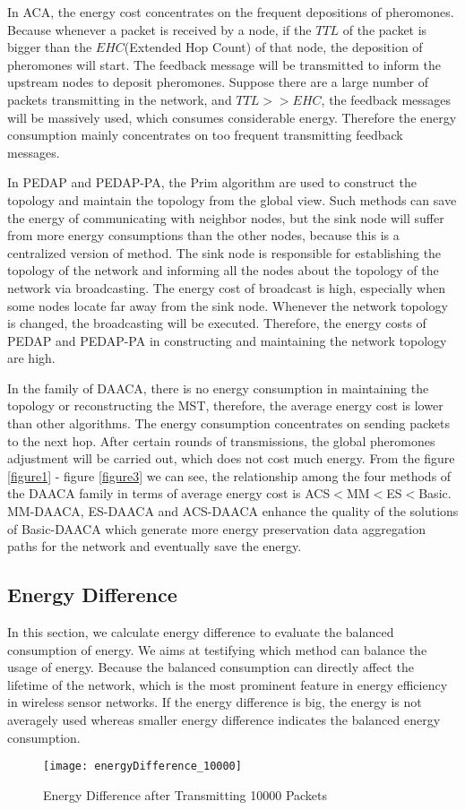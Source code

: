 \documentclass{elsarticle}
\begin{document}
In ACA, the energy cost concentrates on the frequent depositions of pheromones. Because whenever a packet is received by a node, if the $TTL$ of the packet is bigger than the $EHC$(Extended Hop Count)\cite{label-10} of that node, the deposition of pheromones will start. The feedback message will be transmitted to inform the upstream nodes to deposit pheromones. Suppose there are a large number of packets transmitting in the network, and $TTL>>EHC$, the feedback messages will be massively used, which consumes considerable energy. Therefore the energy consumption mainly concentrates on too frequent transmitting feedback messages.

In PEDAP and PEDAP-PA, the Prim algorithm are used to construct the topology and maintain the topology from the global view. Such methods can save the energy of communicating with neighbor nodes, but the sink node will suffer from more energy consumptions than the other nodes, because this is a centralized version of method. The sink node is responsible for establishing the topology of the network and informing all the nodes about the topology of the network via broadcasting. The energy cost of broadcast is high, especially when some nodes locate far away from the sink node. Whenever the network topology is changed, the broadcasting will be executed. Therefore, the energy costs of PEDAP and PEDAP-PA in constructing and maintaining the network topology are high.

In the family of DAACA, there is no energy consumption in maintaining the topology or reconstructing the MST, therefore, the average energy cost is lower than other algorithms. The energy consumption concentrates on sending packets to the next hop. After certain rounds of transmissions, the global pheromones adjustment will be carried out, which does not cost much energy. From the figure \ref{figure1} - figure \ref{figure3} we can see, the relationship among the four methods of the DAACA family in terms of average energy cost is ACS$ < $MM$ < $ES$ < $Basic. MM-DAACA, ES-DAACA and ACS-DAACA enhance the quality of the solutions of Basic-DAACA which generate more energy preservation data aggregation paths for the network and eventually save the energy.

\subsection{Energy Difference} \label{EnergyDifference}
In this section, we calculate energy difference to evaluate the balanced consumption of energy. We aims at testifying which method can balance the usage of energy. Because the balanced consumption can directly affect the lifetime of the network, which is the most prominent feature in energy efficiency in wireless sensor networks. If the energy difference is big, the energy is not averagely used whereas smaller energy difference indicates the balanced energy consumption.
\begin{figure}
\centering
  \texttt{[image: energyDifference\_10000]}\\
  \caption{Energy Difference after Transmitting 10000 Packets}\label{figure4}
\end{figure}
\end{document}
